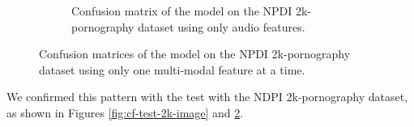 \begin{figure}[!ht]
\begin{subfigure}[b]{0.49\textwidth}
        \caption{Confusion matrix of the model on the NPDI 2k-pornography dataset using only audio features.}
        \label{fig:cf-test-2k-audio}
    \end{subfigure}
    \caption{Confusion matrices of the model on the NPDI 2k-pornography dataset using only one multi-modal feature at a time.}
\end{figure}

We confirmed this pattern with the test with the NDPI 2k-pornography dataset, as shown in Figures \ref{fig:cf-test-2k-image} and \ref{fig:cf-test-2k-audio}.%

